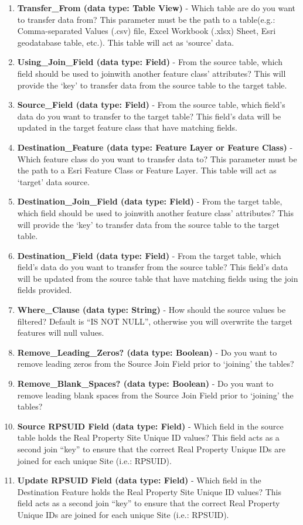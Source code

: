 \documentclass[openany]{book}
\theoremstyle{definition}
\theoremstyle{definition}
\theoremstyle{definition}
\theoremstyle{remark}
\begin{document}
\begin{enumerate}
\def\labelenumi{\arabic{enumi}.}
\item
  \textbf{Transfer\_From (data type: Table View)} - Which table are do
  you want to transfer data from? This parameter must be the path to a
  table(e.g.: Comma-separated Values (.csv) file, Excel Workbook (.xlsx)
  Sheet, Esri geodatabase table, etc.). This table will act as `source'
  data.
\item
  \textbf{Using\_Join\_Field (data type: Field)} - From the source
  table, which field should be used to joinwith another feature class'
  attributes? This will provide the `key' to transfer data from the
  source table to the target table.
\item
  \textbf{Source\_Field (data type: Field)} - From the source table,
  which field's data do you want to transfer to the target table? This
  field's data will be updated in the target feature class that have
  matching fields.
\item
  \textbf{Destination\_Feature (data type: Feature Layer or Feature
  Class)} - Which feature class do you want to transfer data to? This
  parameter must be the path to a Esri Feature Class or Feature Layer.
  This table will act as `target' data source.
\item
  \textbf{Destination\_Join\_Field (data type: Field)} - From the target
  table, which field should be used to joinwith another feature class'
  attributes? This will provide the `key' to transfer data from the
  source table to the target table.
\item
  \textbf{Destination\_Field (data type: Field)} - From the target
  table, which field's data do you want to transfer from the source
  table? This field's data will be updated from the source table that
  have matching fields using the join fields provided.
\item
  \textbf{Where\_Clause (data type: String)} - How should the source
  values be filtered? Default is ``IS NOT NULL'', otherwise you will
  overwrite the target features will null values.
\item
  \textbf{Remove\_Leading\_Zeros? (data type: Boolean)} - Do you want to
  remove leading zeros from the Source Join Field prior to `joining' the
  tables?
\item
  \textbf{Remove\_Blank\_Spaces? (data type: Boolean)} - Do you want to
  remove leading blank spaces from the Source Join Field prior to
  `joining' the tables?
\item
  \textbf{Source RPSUID Field (data type: Field)} - Which field in the
  source table holds the Real Property Site Unique ID values? This field
  acts as a second join ``key'' to ensure that the correct Real Property
  Unique IDs are joined for each unique Site (i.e.: RPSUID).
\item
  \textbf{Update RPSUID Field (data type: Field)} - Which field in the
  Destination Feature holds the Real Property Site Unique ID values?
  This field acts as a second join ``key'' to ensure that the correct
  Real Property Unique IDs are joined for each unique Site (i.e.:
  RPSUID).
\end{enumerate}
\end{document}
